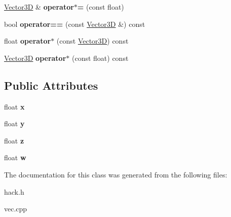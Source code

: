 \begin{DoxyCompactItemize}
\item 
\hypertarget{class_vector3_d_acb8297df60cafc9b31d32f39db0e2f8b}{\hyperlink{class_vector3_d}{Vector3\-D} \& {\bfseries operator$\ast$=} (const float)}\label{class_vector3_d_acb8297df60cafc9b31d32f39db0e2f8b}

\item 
\hypertarget{class_vector3_d_a5199dd8f778deff72cc929e5cf1ed471}{bool {\bfseries operator==} (const \hyperlink{class_vector3_d}{Vector3\-D} \&) const }\label{class_vector3_d_a5199dd8f778deff72cc929e5cf1ed471}

\item 
\hypertarget{class_vector3_d_a18db3e0452fd43081187dc4322c65c80}{float {\bfseries operator$\ast$} (const \hyperlink{class_vector3_d}{Vector3\-D}) const }\label{class_vector3_d_a18db3e0452fd43081187dc4322c65c80}

\item 
\hypertarget{class_vector3_d_a373000c84c9aa81d848e3f249bd0bd10}{\hyperlink{class_vector3_d}{Vector3\-D} {\bfseries operator$\ast$} (const float) const }\label{class_vector3_d_a373000c84c9aa81d848e3f249bd0bd10}

\end{DoxyCompactItemize}
\subsection*{Public Attributes}
\begin{DoxyCompactItemize}
\item 
\hypertarget{class_vector3_d_aca5d15bdb846448e3cb73b072783f329}{float {\bfseries x}}\label{class_vector3_d_aca5d15bdb846448e3cb73b072783f329}

\item 
\hypertarget{class_vector3_d_a9b6d194fcf526d7d4f9e902421285e94}{float {\bfseries y}}\label{class_vector3_d_a9b6d194fcf526d7d4f9e902421285e94}

\item 
\hypertarget{class_vector3_d_af9728f1eba23b9ee091755346214f391}{float {\bfseries z}}\label{class_vector3_d_af9728f1eba23b9ee091755346214f391}

\item 
\hypertarget{class_vector3_d_a7d7b3447b843474b2e6944388294f018}{float {\bfseries w}}\label{class_vector3_d_a7d7b3447b843474b2e6944388294f018}

\end{DoxyCompactItemize}


The documentation for this class was generated from the following files\-:\begin{DoxyCompactItemize}
\item 
hack.\-h\item 
vec.\-cpp\end{DoxyCompactItemize}
